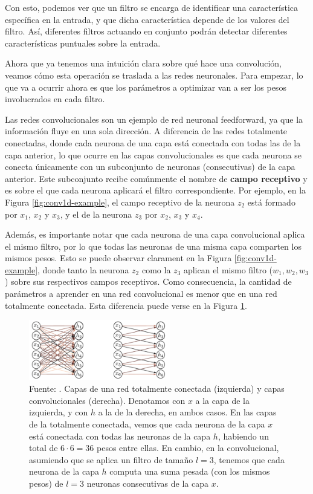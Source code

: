 \documentclass[../../main.tex]{subfiles}
\begin{document}
Con esto, podemos ver que un filtro se encarga de identificar una característica
específica en la entrada, y que dicha característica depende de los valores del filtro.
Así, diferentes filtros actuando en conjunto podrán detectar diferentes características
puntuales sobre la entrada.

Ahora que ya tenemos una intuición clara sobre qué hace una convolución, veamos cómo esta
operación se traslada a las redes neuronales. Para empezar, lo que va a ocurrir ahora es
que los parámetros a optimizar van a ser los pesos involucrados en cada filtro.

Las redes convolucionales son un ejemplo de red neuronal feedforward, ya que la
información fluye en una sola dirección. A diferencia de las redes totalmente conectadas,
donde cada neurona de una capa está conectada con todas las de la capa anterior, lo que
ocurre en las capas convolucionales es que cada neurona se conecta únicamente con un
subconjunto de neuronas (consecutivas) de la capa anterior. Este subconjunto recibe
comúnmente el nombre de \textbf{campo receptivo} y es sobre el que cada neurona aplicará
el filtro correspondiente. Por ejemplo, en la Figura \ref{fig:conv1d-example}, el campo
receptivo de la neurona \(z_2\) está formado por \(x_1\), \(x_2\) y \(x_3\), y el de la
neurona \(z_3\) por \(x_2\), \(x_3\) y \(x_4\).

Además, es importante notar que cada neurona de una capa convolucional aplica el mismo
filtro, por lo que todas las neuronas de una misma capa comparten los mismos pesos. Esto
se puede observar clarament en la Figura \ref{fig:conv1d-example}, donde tanto la neurona
\(z_2\) como la \(z_3\) aplican el mismo filtro (\(w_1, w_2, w_3\)) sobre sus respectivos
campos receptivos. Como consecuencia, la cantidad de parámetros a aprender en una red
convolucional es menor que en una red totalmente conectada. Esta diferencia puede verse en
la Figura \ref{fig:fully-connected-vs-conv}.

\begin{figure}
    \centering
    \includegraphics[width=0.55\textwidth]{figs/fully-connected-vs-conv.png}
    \caption{Fuente: \cite{prince2024understanding}. Capas de una red totalmente conectada
    (izquierda) y capas convolucionales (derecha). Denotamos con \(x\) a la capa de la
    izquierda, y con \(h\) a la de la derecha, en ambos casos. En las capas de la totalmente
    conectada, vemos que cada neurona de la capa \(x\) está conectada con todas las
    neuronas de la capa \(h\), habiendo un total de \(6 \cdot 6 = 36\) pesos entre ellas.
    En cambio, en la convolucional, asumiendo que se aplica un filtro de tamaño \(l=3\),
    tenemos que cada neurona de la capa \(h\) computa una suma pesada (con los mismos
    pesos) de \(l=3\) neuronas consecutivas de la capa \(x\).}
    \label{fig:fully-connected-vs-conv}
\end{figure}
\end{document}
